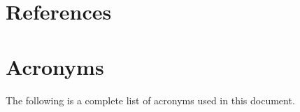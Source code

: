 
\section{References\label{sect:refs}}
\renewcommand{\refname}{}




\section{Acronyms \label{sect:acronyms}}
The following is a complete list of acronyms used in this document.


